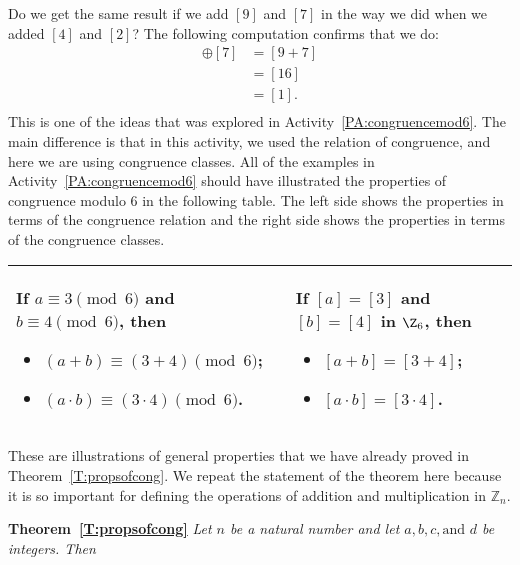 \noindent
Do we get the same result if we add  $[ 9 ]$  and  $[ 7 ]$ in the way we did when we added $[ 4 ]$  and  $[ 2 ]$?  The following computation confirms that we do:
\begin{align*}
  [ 9 ] \oplus [ 7 ] &= [ {9 + 7} ] \\ 
                     &= [ {16} ] \\ 
                     &= [ 1 ]. \\ 
\end{align*}
This is one of the ideas that was explored in \typeu Activity~\ref*{PA:congruencemod6}.  The main difference is that in this activity, we used the relation of congruence, and here we are using congruence classes.  All of the examples in \typeu Activity~\ref*{PA:congruencemod6} should have illustrated the properties of congruence modulo 6 in the following table.  The left side shows the properties in terms of the congruence relation and the right side shows the properties in terms of the congruence classes.

\begin{center}
\begin{tabular}{| p{2.7in} | p{1.8in} |} \hline
If  $a \equiv 3 \pmod 6$ and  $b \equiv 4 \pmod 6$, then
\begin{itemize}
  \item $\left( {a + b} \right) \equiv \left( {3 + 4} \right) \pmod 6$;
  \item $\left( {a \cdot b} \right) \equiv \left( {3 \cdot 4} \right) \pmod 6$.
\end{itemize}
&
If  $[ a ] = [ 3 ]$  and  $[ b ] = [ 4 ]$ in $\Z_6$, then
\begin{itemize}
  \item $[ {a + b} ] = [ {3 + 4} ]$;
  \item $[ {a \cdot b} ] = [ {3 \cdot 4} ]$.
\end{itemize}  \\ \hline

\end{tabular}
\end{center}
%
These are illustrations of general properties that we have already proved in Theorem~\ref{T:propsofcong}.  We repeat the statement of the theorem here because it is so important for defining the operations of addition and multiplication in 
$\mathbb{Z}_{n}$.
\hbreak

\noindent
\textbf{Theorem~\ref{T:propsofcong}}
\emph{Let  $n$  be a natural number and let  $a, b, c, \text{and }  d$  be integers.  Then}

